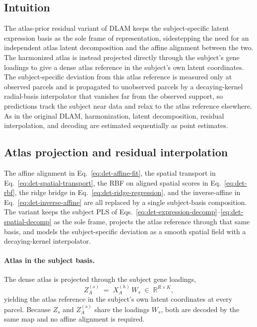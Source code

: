 \documentclass[11pt]{article}
\numberwithin{equation}{section}
\begin{document}
\subsection{Intuition}
The atlas-prior residual variant of DLAM keeps the subject-specific latent
expression basis as the sole frame of representation, sidestepping the need for an
independent atlas latent decomposition and the affine alignment between the two.
The harmonized atlas is instead projected directly through the subject's gene
loadings to give a dense atlas reference in the subject's own latent coordinates.
The subject-specific deviation from this atlas reference is measured only at
observed parcels and is propagated to unobserved parcels by a decaying-kernel
radial-basis interpolator that vanishes far from the observed support, so
predictions track the subject near data and relax to the atlas reference
elsewhere.  As in the original DLAM, harmonization, latent decomposition, residual
interpolation, and decoding are estimated sequentially as point estimates.

\subsection{Atlas projection and residual interpolation}
\label{sec:tprior-align}

The affine alignment in Eq.~\eqref{eq:det-affine-fit}, the spatial transport in
Eq.~\eqref{eq:det-spatial-transport}, the RBF on aligned spatial scores in
Eq.~\eqref{eq:det-rbf}, the ridge bridge in Eq.~\eqref{eq:det-ridge-regression},
and the inverse-affine in Eq.~\eqref{eq:det-inverse-affine} are all replaced by a
single subject-basis composition.  The variant keeps the subject PLS of
Eqs.~\eqref{eq:det-expression-decomp}--\eqref{eq:det-spatial-decomp} as the sole
frame, projects the atlas reference through that same basis, and models the
subject-specific deviation as a smooth spatial field with a decaying-kernel
interpolator.

\paragraph{Atlas in the subject basis.}
The dense atlas is projected through the subject gene loadings,
\begin{equation}
  \label{eq:tprior-encode}
  Z_A^{(s)} \;=\; X_A^{(h)}\, W_s \;\in\; \mathbb{R}^{R\times K},
\end{equation}
yielding the atlas reference in the subject's own latent coordinates at every
parcel.  Because $Z_s$ and $Z_A^{(s)}$ share the loadings $W_s$, both are decoded
by the same map and no affine alignment is required.
\end{document}
